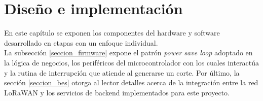 \chapter{Diseño e implementación} %
\label{Chapter3} %
En este capítulo se exponen los componentes del hardware y software desarrollado en etapas con un enfoque individual.\\
La subsección \ref{seccion_firmware} expone el patrón \textit{power save loop} adoptado en la lógica de negocios, los periféricos del microcontrolador con los cuales interactúa y la rutina de interrupción que atiende al generarse un corte.
Por último, la sección \ref{seccion_bes} otorga al lector detalles acerca de la integración entre la red LoRaWAN y los servicios de backend implementados para este proyecto.


